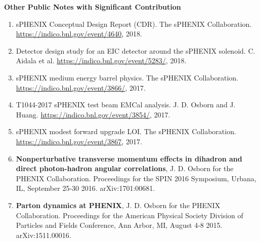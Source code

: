\documentclass[11pt]{article}
\begin{document}
\begin{flushleft}

\vspace{7pt}
\LARGE\textbf{Other Public Notes with Significant Contribution} \\
\vspace{2pt}
	\begin{center}
	\normalsize
	\begin{enumerate}
		\item sPHENIX Conceptual Design Report (CDR). The sPHENIX Collaboration. \textcolor{red}{\href{https://indico.bnl.gov/event/4640/}{https://indico.bnl.gov/event/4640}}, 2018.
		 \item Detector design study for an EIC detector around the sPHENIX solenoid. C. Aidala et al. \textcolor{red}{\href{https://indico.bnl.gov/event/5283/}{https://indico.bnl.gov/event/5283/}}, 2018.
		 \item sPHENIX medium energy barrel physics. The sPHENIX Collaboration. \textcolor{red}{\href{https://indico.bnl.gov/event/3866/}{https://indico.bnl.gov/event/3866/}}, 2017.
 		 \item T1044-2017 sPHENIX test beam EMCal analysis. J. D. Osborn and J. Huang. \textcolor{red}{\href{https://indico.bnl.gov/event/3854/}{https://indico.bnl.gov/event/3854/}}, 2017.
		\item sPHENIX modest forward upgrade LOI. The sPHENIX Collaboration. \textcolor{red}{\href{https://indico.bnl.gov/event/3867/}{https://indico.bnl.gov/event/3867}}, 2017.
		\item \textbf{Nonperturbative transverse momentum effects in dihadron and direct photon-hadron angular correlations}, J. D. Osborn for the PHENIX Collaboration. Proceedings for the SPIN 2016 Symposium, Urbana, IL, September 25-30 2016. arXiv:1701:00681.
		\item \textbf{Parton dynamics at PHENIX}, J. D. Osborn for the PHENIX Collaboration. Proceedings for the American Physical Society Division of Particles and Fields Conference, Ann Arbor, MI, August 4-8 2015. arXiv:1511.00016. 
	

\end{enumerate}

\end{center}

\end{flushleft}




\vspace{7pt}
\end{document}
